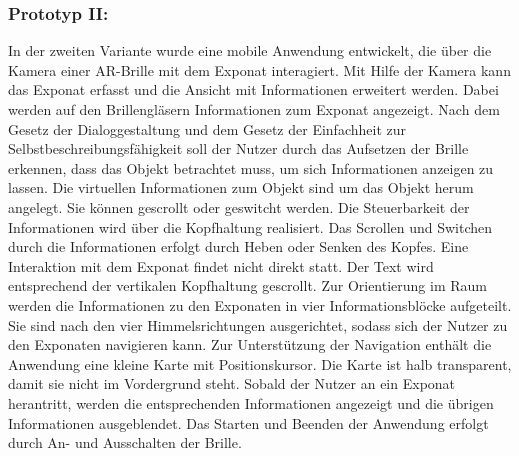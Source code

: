 \documentclass[runningheads,a4paper, 12pt]{llncs}
\begin{document}
\subsubsection{Prototyp II:} \label{chapt:paperprotoII}
In der zweiten Variante wurde eine mobile Anwendung entwickelt, die über die Kamera einer AR-Brille mit dem Exponat interagiert. Mit Hilfe der Kamera kann das Exponat erfasst und die Ansicht mit Informationen erweitert werden. Dabei werden auf den Brillengläsern Informationen zum Exponat angezeigt. Nach dem Gesetz der Dialoggestaltung und dem Gesetz der Einfachheit zur Selbstbeschreibungsfähigkeit soll der Nutzer durch das Aufsetzen der Brille erkennen, dass das Objekt betrachtet muss, um sich Informationen anzeigen zu lassen. Die virtuellen Informationen zum Objekt sind um das Objekt herum angelegt. Sie können gescrollt oder geswitcht werden. Die Steuerbarkeit der Informationen wird über die Kopfhaltung realisiert. Das Scrollen und Switchen durch die Informationen erfolgt durch Heben oder Senken des Kopfes. Eine Interaktion mit dem Exponat findet nicht direkt statt. Der Text wird entsprechend der vertikalen Kopfhaltung gescrollt. Zur Orientierung im Raum werden die Informationen zu den Exponaten in vier Informationsblöcke aufgeteilt. Sie sind nach den vier Himmelsrichtungen ausgerichtet, sodass sich der Nutzer zu den Exponaten navigieren kann. Zur Unterstützung der Navigation enthält die Anwendung eine kleine Karte mit Positionskursor. Die Karte ist halb transparent, damit sie nicht im Vordergrund steht. Sobald der Nutzer an ein Exponat herantritt, werden die entsprechenden Informationen angezeigt und die übrigen Informationen ausgeblendet. Das Starten und Beenden der Anwendung erfolgt durch An- und Ausschalten der Brille.
\end{document}
